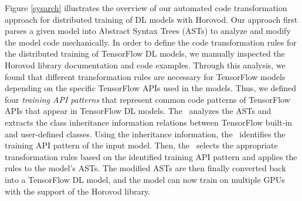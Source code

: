 Figure \ref{sysarch} illustrates the overview of our automated code
transformation approach for distributed training of DL models with Horovod.
Our approach first parses a given model into Abstract Syntax Trees
(ASTs) to analyze and modify the model code mechanically.
In order to define the code transformation rules for the distributed training
of TensorFlow DL models, we manually inspected the Horovod library
documentation and code examples. 
Through this analysis, we found that different transformation rules are
necessary for TensorFlow models depending on the specific TensorFlow APIs used
in the models.
Thus, we defined four \textit{training API patterns} that represent common code
patterns of TensorFlow APIs that appear in TensorFlow DL models.
The \cha~analyzes the ASTs and extracts the class
inheritance information relations between TensorFlow built-in and
user-defined classes.
Using the inheritance information, the \tapi~identifies the training API
pattern of the input model.  Then, the \atran~selects the appropriate
transformation rules based on the identified training API pattern and applies
the rules to the model's ASTs. 
The modified ASTs are then finally converted back into a TensorFlow DL
model, and the model can now train on multiple GPUs with the support of
the Horovod library.






